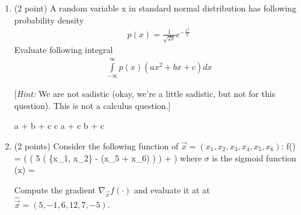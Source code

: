 \begin{enumerate}[start]
\item (2 point) A random variable x in standard normal distribution 
has following probability density
%
\begin{align}
p(x) = \frac{1}{{\sqrt {2\pi } }}{e^{ - \frac{{{x^2}}}{2}}}
\end{align}
%
Evaluate following integral
%
\begin{align}
\int\limits_{ - \infty }^\infty  {p(x)(a{x^2} + b{x} + c)dx}
\end{align}

[\emph{Hint:} We are not sadistic (okay, we're a little sadistic, but not for this question). This is not a calculus question.]\\

\begin{oneparcheckboxes}
	\choice a + b + c
	\choice c
	\choice a + c
	\choice b + c
\end{oneparcheckboxes}

\vspace{2cm}

	\item
	(2 points)
	Consider the following function of $\vec{x} = (x_1, x_2, x_3, x_4, x_5, x_6)$:
	\beqn
	f() = \sigma\left( \log\left( 5 \left(
	\max\{x_1, x_2\} \cdot {} - (x_5 + x_6) \right)
	\right) +  \right)
	\eeqn
	where $\sigma$ is the sigmoid function
	\beqn
	\sigma(x) = 
	\eeqn
	
	Compute the gradient $\nabla_{\vec{x}} f(\cdot)$ and evaluate it at at $\hat{\vec{x}} = (5, -1, 6, 12, 7, -5)$.
	

\end{enumerate}
